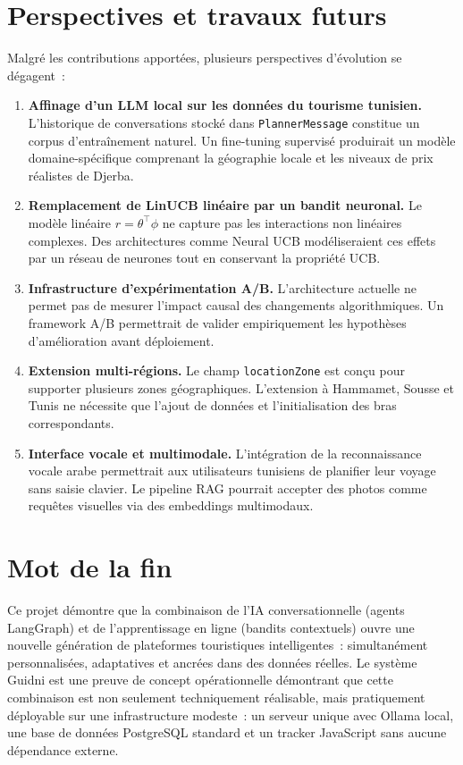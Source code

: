 \section*{Perspectives et travaux futurs}

Malgré les contributions apportées, plusieurs perspectives d'évolution se dégagent~:

\begin{enumerate}
    \item \textbf{Affinage d'un LLM local sur les données du tourisme tunisien.}
    L'historique de conversations stocké dans \texttt{PlannerMessage} constitue un corpus
    d'entraînement naturel. Un fine-tuning supervisé produirait un modèle domaine-spécifique
    comprenant la géographie locale et les niveaux de prix réalistes de Djerba.

    \item \textbf{Remplacement de LinUCB linéaire par un bandit neuronal.}
    Le modèle linéaire $r = \theta^\top \phi$ ne capture pas les interactions non linéaires
    complexes. Des architectures comme Neural UCB modéliseraient ces effets par un réseau de
    neurones tout en conservant la propriété UCB.

    \item \textbf{Infrastructure d'expérimentation A/B.}
    L'architecture actuelle ne permet pas de mesurer l'impact causal des changements
    algorithmiques. Un framework A/B permettrait de valider empiriquement les hypothèses
    d'amélioration avant déploiement.

    \item \textbf{Extension multi-régions.}
    Le champ \texttt{locationZone} est conçu pour supporter plusieurs zones géographiques.
    L'extension à Hammamet, Sousse et Tunis ne nécessite que l'ajout de données et
    l'initialisation des bras correspondants.

    \item \textbf{Interface vocale et multimodale.}
    L'intégration de la reconnaissance vocale arabe permettrait aux utilisateurs tunisiens
    de planifier leur voyage sans saisie clavier. Le pipeline RAG pourrait accepter des
    photos comme requêtes visuelles via des embeddings multimodaux.
\end{enumerate}


\section*{Mot de la fin}

Ce projet démontre que la combinaison de l'IA conversationnelle (agents LangGraph) et de
l'apprentissage en ligne (bandits contextuels) ouvre une nouvelle génération de plateformes
touristiques intelligentes~: simultanément personnalisées, adaptatives et ancrées dans des
données réelles. Le système Guidni est une preuve de concept opérationnelle démontrant que
cette combinaison est non seulement techniquement réalisable, mais pratiquement déployable
sur une infrastructure modeste~: un serveur unique avec Ollama local, une base de données
PostgreSQL standard et un tracker JavaScript sans aucune dépendance externe.
